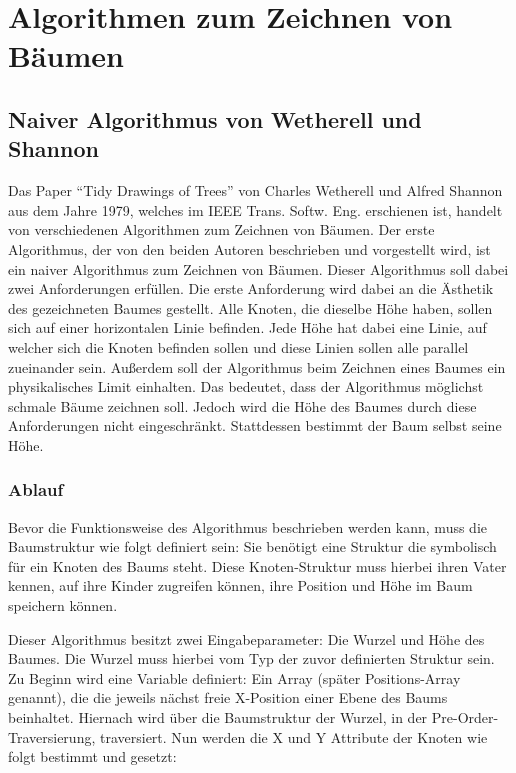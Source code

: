 \chapter{Algorithmen zum Zeichnen von Bäumen}
\label{chap:kapitel3}

\section{Naiver Algorithmus von Wetherell und Shannon}

Das Paper “Tidy Drawings of Trees” von Charles Wetherell und Alfred Shannon aus dem Jahre 1979, 
welches im IEEE Trans. Softw. Eng. erschienen ist, handelt von verschiedenen Algorithmen zum Zeichnen von Bäumen.
Der erste Algorithmus, der von den beiden Autoren beschrieben und vorgestellt wird, ist ein naiver Algorithmus 
zum Zeichnen von Bäumen. Dieser Algorithmus soll dabei zwei Anforderungen erfüllen. Die erste Anforderung wird dabei
an die Ästhetik des gezeichneten Baumes gestellt. Alle Knoten, die dieselbe Höhe haben, sollen sich auf einer horizontalen
Linie befinden. Jede Höhe hat dabei eine Linie, auf welcher sich die Knoten befinden sollen und diese Linien sollen alle
parallel zueinander sein. Außerdem soll der Algorithmus beim Zeichnen eines Baumes ein physikalisches Limit einhalten.
Das bedeutet, dass der Algorithmus möglichst schmale Bäume zeichnen soll. Jedoch wird die Höhe des Baumes durch diese Anforderungen
nicht eingeschränkt. Stattdessen bestimmt der Baum selbst seine Höhe. \cite[]{q1}

\subsection{Ablauf}
Bevor die Funktionsweise des Algorithmus beschrieben werden kann, muss die Baumstruktur 
wie folgt definiert sein: Sie benötigt eine Struktur die symbolisch für ein Knoten des Baums steht. 
Diese Knoten-Struktur muss hierbei ihren Vater kennen, auf ihre Kinder zugreifen können, ihre Position und
Höhe im Baum speichern können.

Dieser Algorithmus besitzt zwei Eingabeparameter: Die Wurzel und Höhe des Baumes.
Die Wurzel muss hierbei vom Typ der zuvor definierten Struktur sein. Zu Beginn wird eine Variable definiert:
Ein Array (später Positions-Array genannt), die die jeweils nächst freie X-Position einer Ebene des Baums beinhaltet.
Hiernach wird über die Baumstruktur der Wurzel, in der Pre-Order-Traversierung, traversiert.
Nun werden die X und Y Attribute der Knoten wie folgt bestimmt und gesetzt:

